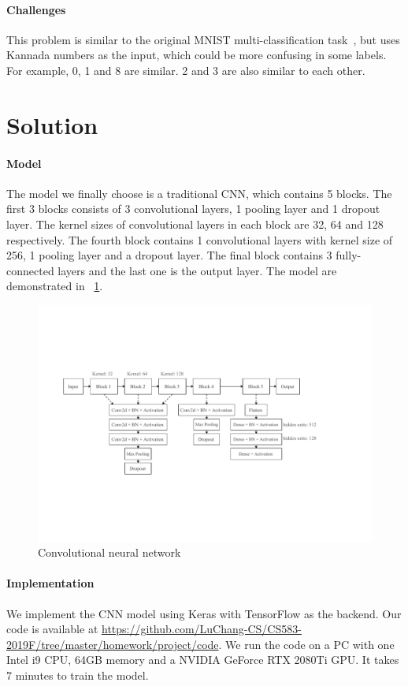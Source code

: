 \documentclass[]{article}
\begin{document}
\paragraph{Challenges}
This problem is similar to the original MNIST multi-classification task~\cite{lecun:mnist}, but uses Kannada numbers as the input, which could be more confusing in some labels. For example, 0, 1 and 8 are similar. 2 and 3 are also similar to each other.

\section{Solution}
\paragraph{Model}
The model we finally choose is a traditional CNN, which contains 5 blocks. The first 3 blocks consists of 3 convolutional layers, 1 pooling layer and 1 dropout layer. The kernel sizes of convolutional layers in each block are 32, 64 and 128 respectively. The fourth block contains 1 convolutional layers with kernel size of 256, 1 pooling layer and a dropout layer. The final block contains 3 fully-connected layers and the last one is the output layer. The model are demonstrated in \figurename{~\ref{fig:modelcnn}}.
\begin{figure}[H]
    \centering
    \includegraphics[width=14.5cm]{figs/model}
    \caption{Convolutional neural network}
    \label{fig:modelcnn}
\end{figure}

\paragraph{Implementation}
We implement the CNN model using Keras with TensorFlow as the backend. Our code is available at \url{https://github.com/LuChang-CS/CS583-2019F/tree/master/homework/project/code}. We run the code on a PC with one Intel i9 CPU, 64GB memory and a NVIDIA GeForce RTX 2080Ti GPU. It takes 7 minutes to train the model.
\end{document}
